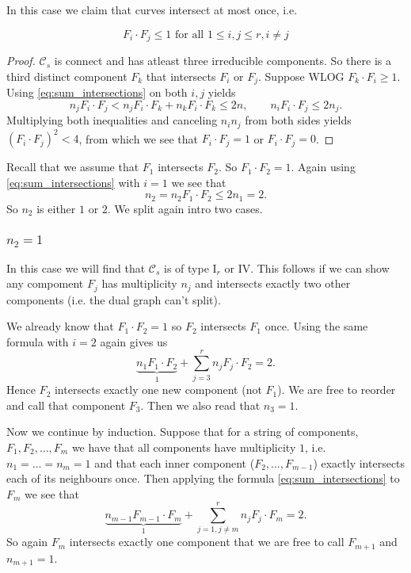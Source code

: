 In this case we claim that curves intersect at most once, i.e. 
\begin{claim}
\[
	F_i \cdot F_j \le 1 \text{ for all }  1 \le i, j \le r, i \ne j
\]
\end{claim}
\begin{proof}
	$\mathcal{C} _s$ is connect and has atleast three irreducible components. 
	So there is a third distinct component $F_k$ that intersects $F_i$ or $F_j$. Suppose WLOG $F_k \cdot F_i \ge 1$. 
	Using \eqref{eq:sum_intersections} on both  $i, j$ yields \[
	n_j F_i \cdot F_j < n_j F_i \cdot  F_k + n_k F_i \cdot  F_k \le 2n, \qquad n_i F_i \cdot F_j \le 2 n_j
	.\] 
	Multiplying both inequalities and canceling $n_i n_j$ from both sides yields $(F_i \cdot  F_j)^2 < 4$, from which we see that $F_i \cdot  F_j = 1$ or $F_i \cdot F_j = 0$. 
\end{proof}

Recall that we assume that $F_1$ intersects $F_2$. So $F_1 \cdot  F_2 = 1$. 
Again using  \eqref{eq:sum_intersections} with $i = 1$ we see that \[
n_2 = n_2 F_1 \cdot F_2 \le 2n_1 = 2
.\] 
So $n_2$ is either $1$ or $2$. We split again intro two cases. 
\subsubsection{$n_2 = 1$} 
In this case we will find that $\mathcal{C} _s$ is of type $\text{I}_r$ or $\text{IV}$. This follows if we can show any compoment $F_j$ has multiplicity $n_j$ and intersects exactly two other components (i.e. the dual graph can't split). 

We already know that $F_1 \cdot F_2 = 1$ so $F_2$ intersects $F_1$ once. Using the same formula with $i = 2$ again gives us \[
	\underbrace{n_1 F_1\cdot F_2}_{1} + \sum_{j = 3}^{r}  n_j F_j \cdot F_2 = 2
.\] 
Hence $F_2$ intersects exactly one new component (not $F_1$). We are free to reorder and call that component $F_3$. Then we also read that $n_3 = 1$.  

Now we continue by induction. Suppose that for a string of components, $F_1, F_2, \ldots, F_m$ we have that all components have multiplicity $1$, i.e.\ $n_1 = \ldots = n_{m} = 1$ and that each inner component ($F_2, \ldots, F_{m -1}$) exactly intersects each of its neighbours once. 
Then applying the formula \eqref{eq:sum_intersections} to $F_m$ we see that \[
	\underbrace{n_{m -1} F_{m - 1} \cdot F_m}_1 + \sum_{j= 1, j\ne m}^{r} n_j F_j \cdot F_m  = 2
.\] 
So again $F_m$ intersects exactly one component that we are free to call $F_{m + 1}$ and $n_{m + 1} = 1$. 

